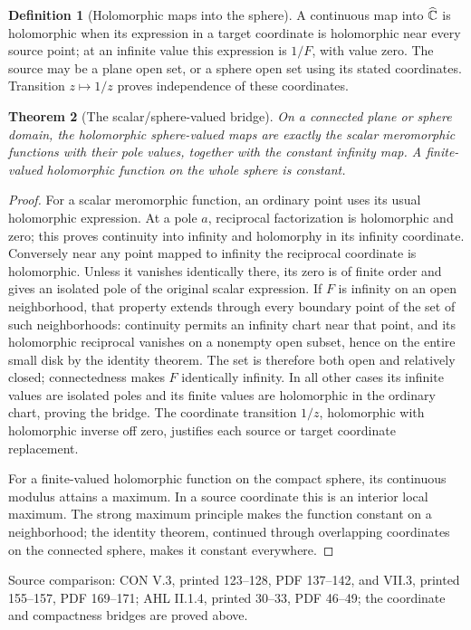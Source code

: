 \documentclass[11pt,a4paper,openany]{book}
\newtheorem{theorem}{Theorem}[chapter]
\theoremstyle{definition}
\newtheorem{definition}[theorem]{Definition}
\theoremstyle{remark}\newtheorem{remark}[theorem]{Remark}
\newcommand{\family}[1]{}
\newcommand{\source}[1]{\par\begingroup\small\sffamily\color{black!65}Source comparison: #1\par\endgroup}
\begin{document}
\begin{definition}[Holomorphic maps into the sphere]\family{D12.07.07}\label{d12:07-07}
A continuous map into \(\widehat{\mathbb C}\) is holomorphic when its expression in
a target coordinate is holomorphic near every source point; at an
infinite value this expression is \(1/F\), with value zero.
The source may be a plane open set, or a sphere open set using its
stated coordinates. Transition \(z\mapsto1/z\) proves independence
of these coordinates.
\end{definition}
\begin{theorem}[The scalar/sphere-valued bridge]\label{d12:07-07-bridge}
On a connected plane or sphere domain, the holomorphic sphere-valued
maps are exactly the scalar meromorphic functions with their pole values,
together with the constant infinity map.
A finite-valued holomorphic function on the whole sphere is constant.
\end{theorem}
\begin{proof}
For a scalar meromorphic function, an ordinary point uses its usual
holomorphic expression. At a pole \(a\), reciprocal factorization is
holomorphic and zero; this proves continuity into infinity and
holomorphy in its infinity coordinate.
Conversely near any point mapped to infinity the reciprocal coordinate
is holomorphic. Unless it vanishes identically there, its zero is of
finite order and gives an isolated pole of the original scalar expression.
If \(F\) is infinity on an open neighborhood, that property extends
through every boundary point of the set of such neighborhoods:
continuity permits an infinity chart near that point, and its
holomorphic reciprocal vanishes on a nonempty open subset, hence on
the entire small disk by the identity theorem.
The set is therefore both open and relatively closed; connectedness
makes \(F\) identically infinity. In all other cases its infinite
values are isolated poles and its finite values are holomorphic in
the ordinary chart, proving the bridge. The coordinate transition
\(1/z\), holomorphic with holomorphic inverse off zero, justifies each
source or target coordinate replacement.

For a finite-valued holomorphic function on the compact sphere, its
continuous modulus attains a maximum. In a source coordinate this is an
interior local maximum. The strong maximum principle makes the function
constant on a neighborhood; the identity theorem, continued through
overlapping coordinates on the connected sphere, makes it constant
everywhere.
\end{proof}
\source{CON V.3, printed 123--128, PDF 137--142, and VII.3, printed 155--157, PDF 169--171; AHL II.1.4, printed 30--33, PDF 46--49; the coordinate and compactness bridges are proved above.}
\end{document}

